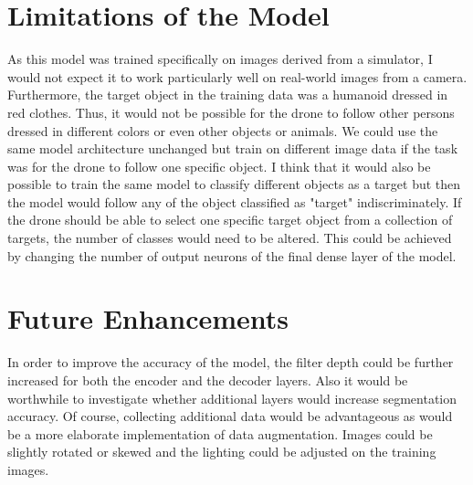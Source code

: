 \documentclass[twoside, twocolumn]{article}
\begin{document}
\section{Limitations of the Model}
As this model was trained specifically on images derived from a simulator, I would
not expect it to work particularly well on real-world images from a camera. Furthermore,
the target object in the training data was a humanoid dressed in red clothes. Thus,
it would not be possible for the drone to follow other persons dressed in different colors or
even other objects or animals. We could use the same model architecture unchanged but train on
different image data if the task was for the drone to follow one specific object.
I think that it would also be possible to train the same model to classify different
objects as a target but then the model would follow any of the object classified as "target"
indiscriminately. If the drone should be able to select one specific target object from
a collection of targets, the number of classes would need to be altered. This could
be achieved by changing the number of output neurons of the final dense layer of the
model.

\section{Future Enhancements}
In order to improve the accuracy of the model, the filter depth could be further increased
for both the encoder and the decoder layers. Also it would be worthwhile to investigate
whether additional layers would increase segmentation accuracy. Of course, collecting
additional data would be advantageous as would be a more elaborate implementation
of data augmentation. Images could be slightly rotated or skewed and the lighting could be
adjusted on the training images.

%
%
\end{document}
